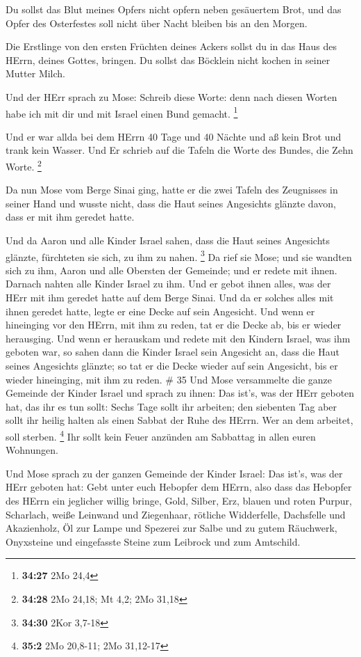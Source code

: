  Du sollst das Blut meines Opfers nicht opfern neben
gesäuertem Brot, und das Opfer des Osterfestes soll nicht über Nacht
bleiben bis an den Morgen.

 Die Erstlinge von den ersten Früchten deines Ackers sollst
du in das Haus des HErrn, deines Gottes, bringen. Du sollst das Böcklein
nicht kochen in seiner Mutter Milch.

 Und der HErr sprach zu Mose: Schreib diese Worte: denn
nach diesen Worten habe ich mit dir und mit Israel einen Bund gemacht.
\footnote{\textbf{34:27} 2Mo 24,4}

 Und er war allda bei dem HErrn 40 Tage und 40 Nächte und
aß kein Brot und trank kein Wasser. Und Er schrieb auf die Tafeln die
Worte des Bundes, die Zehn Worte. \footnote{\textbf{34:28} 2Mo 24,18; Mt
  4,2; 2Mo 31,18}

 Da nun Mose vom Berge Sinai ging, hatte er die zwei Tafeln
des Zeugnisses in seiner Hand und wusste nicht, dass die Haut seines
Angesichts glänzte davon, dass er mit ihm geredet hatte.

 Und da Aaron und alle Kinder Israel sahen, dass die Haut
seines Angesichts glänzte, fürchteten sie sich, zu ihm zu nahen.
\footnote{\textbf{34:30} 2Kor 3,7-18}  Da rief sie Mose;
und sie wandten sich zu ihm, Aaron und alle Obersten der Gemeinde; und
er redete mit ihnen.  Darnach nahten alle Kinder Israel zu
ihm. Und er gebot ihnen alles, was der HErr mit ihm geredet hatte auf
dem Berge Sinai.  Und da er solches alles mit ihnen geredet
hatte, legte er eine Decke auf sein Angesicht.  Und wenn er
hineinging vor den HErrn, mit ihm zu reden, tat er die Decke ab, bis er
wieder herausging. Und wenn er herauskam und redete mit den Kindern
Israel, was ihm geboten war,  so sahen dann die Kinder
Israel sein Angesicht an, dass die Haut seines Angesichts glänzte; so
tat er die Decke wieder auf sein Angesicht, bis er wieder hineinging,
mit ihm zu reden. \# 35  Und Mose versammelte die ganze
Gemeinde der Kinder Israel und sprach zu ihnen: Das ist's, was der HErr
geboten hat, das ihr es tun sollt:  Sechs Tage sollt ihr
arbeiten; den siebenten Tag aber sollt ihr heilig halten als einen
Sabbat der Ruhe des HErrn. Wer an dem arbeitet, soll sterben.
\footnote{\textbf{35:2} 2Mo 20,8-11; 2Mo 31,12-17}  Ihr
sollt kein Feuer anzünden am Sabbattag in allen euren Wohnungen.

 Und Mose sprach zu der ganzen Gemeinde der Kinder Israel:
Das ist's, was der HErr geboten hat:  Gebt unter euch
Hebopfer dem HErrn, also dass das Hebopfer des HErrn ein jeglicher
willig bringe, Gold, Silber, Erz,  blauen und roten Purpur,
Scharlach, weiße Leinwand und Ziegenhaar,  rötliche
Widderfelle, Dachsfelle und Akazienholz,  Öl zur Lampe und
Spezerei zur Salbe und zu gutem Räuchwerk,  Onyxsteine und
eingefasste Steine zum Leibrock und zum Amtschild.

